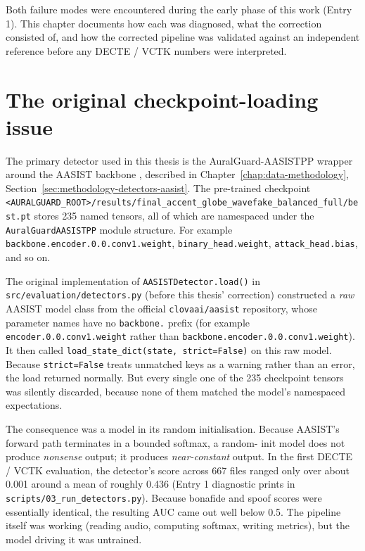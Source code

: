 Both failure modes were encountered during the early phase of this
work (Entry 1). This chapter documents how each was diagnosed,
what the correction consisted of, and how the corrected pipeline
was validated against an independent reference before any
DECTE / VCTK numbers were interpreted.


\section{The original checkpoint-loading issue}
\label{sec:detector-verification-loader-bug}

The primary detector used in this thesis is the AuralGuard-AASISTPP
wrapper around the AASIST backbone \cite{Jung2022_AASIST}, described in
Chapter~\ref{chap:data-methodology}, Section~\ref{sec:methodology-detectors-aasist}. The pre-trained checkpoint
\texttt{<AURALGUARD\_ROOT>/}\allowbreak\texttt{results/}\allowbreak\texttt{final\_accent\_globe\_wavefake\_balanced\_full/}\allowbreak\texttt{best.pt}
stores 235 named tensors, all of which are namespaced under the
\texttt{AuralGuardAASISTPP} module structure. For example
\texttt{backbone.encoder.0.0.conv1.weight},
\texttt{binary\_head.weight}, \texttt{attack\_head.bias}, and so on.

The original implementation of \texttt{AASISTDetector.load()} in
\texttt{src/}\allowbreak\texttt{evaluation/}\allowbreak\texttt{detectors.py} (before this thesis' correction)
constructed a \emph{raw} AASIST model class from the official
\texttt{clovaai/aasist} repository, whose parameter names have no
\texttt{backbone.} prefix (for example \texttt{encoder.0.0.}\allowbreak\texttt{conv1.weight} rather
than \texttt{backbone.encoder.}\allowbreak\texttt{0.0.conv1.weight}). It then called
\texttt{load\_state\_dict}\allowbreak\texttt{(state, strict=False)} on this raw model. Because
\texttt{strict=False} treats unmatched keys as a warning rather than
an error, the load returned normally. But every single one of the
235 checkpoint tensors was silently discarded, because none of them
matched the model's namespaced expectations.

The consequence was a model in its random initialisation. Because
AASIST's forward path terminates in a bounded softmax, a random-%
init model does not produce \emph{nonsense} output; it produces
\emph{near-constant} output. In the first DECTE / VCTK evaluation, the
detector's score across 667 files ranged only over about 0.001
around a mean of roughly 0.436 (Entry 1 diagnostic prints in
\texttt{scripts/03\_run\_detectors.py}). Because bonafide and spoof scores
were essentially identical, the resulting AUC came out well below
0.5. The pipeline itself was working (reading audio, computing
softmax, writing metrics), but the model driving it was untrained.

